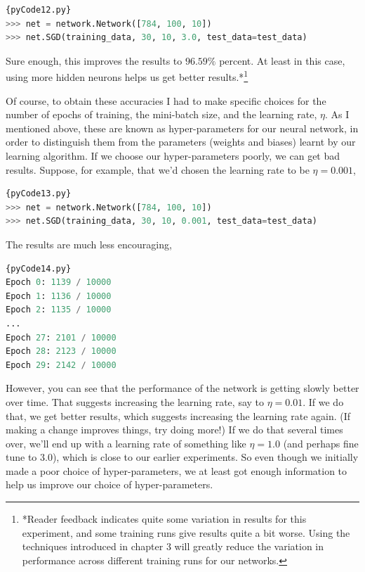 \documentclass[a4paper,12pt]{report}%
\begin{document}
\begin{lstlisting}[language=Python,breaklines,basicstyle=\footnotesize\ttfamily]{pyCode12.py}
>>> net = network.Network([784, 100, 10])
>>> net.SGD(training_data, 30, 10, 3.0, test_data=test_data)
\end{lstlisting}

Sure enough, this improves the results to $96.59\%$ percent. At least in this case, using more hidden neurons helps us get better results.*\footnote{\color{blue}*Reader feedback indicates quite some variation in results for this experiment, and some training runs give results quite a bit worse. Using the techniques introduced in chapter 3 will greatly reduce the variation in performance across different training runs for our networks.}

Of course, to obtain these accuracies I had to make specific choices for the number of epochs of training, the mini-batch size, and the learning rate, $\eta$. As I mentioned above, these are known as hyper-parameters for our neural network, in order to distinguish them from the parameters (weights and biases) learnt by our learning algorithm. If we choose our hyper-parameters poorly, we can get bad results. Suppose, for example, that we'd chosen the learning rate to be $η=0.001$,

\begin{lstlisting}[language=Python,breaklines,basicstyle=\footnotesize\ttfamily]{pyCode13.py}
>>> net = network.Network([784, 100, 10])
>>> net.SGD(training_data, 30, 10, 0.001, test_data=test_data)
\end{lstlisting}

The results are much less encouraging,

\begin{lstlisting}[language=Python,breaklines,basicstyle=\footnotesize\ttfamily]{pyCode14.py}
Epoch 0: 1139 / 10000
Epoch 1: 1136 / 10000
Epoch 2: 1135 / 10000
...
Epoch 27: 2101 / 10000
Epoch 28: 2123 / 10000
Epoch 29: 2142 / 10000
\end{lstlisting}

However, you can see that the performance of the network is getting slowly better over time. That suggests increasing the learning rate, say to $η=0.01$. If we do that, we get better results, which suggests increasing the learning rate again. (If making a change improves things, try doing more!) If we do that several times over, we'll end up with a learning rate of something like $η=1.0$ (and perhaps fine tune to $3.0$), which is close to our earlier experiments. So even though we initially made a poor choice of hyper-parameters, we at least got enough information to help us improve our choice of hyper-parameters.
\end{document}
